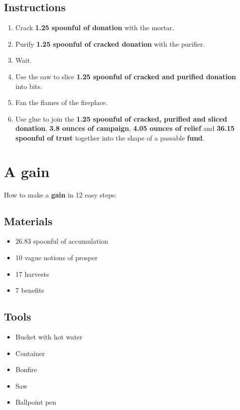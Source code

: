 \documentclass{article}
\begin{document}
\subsection{Instructions}\begin{enumerate}
\item 
Crack \textbf{1.25 spoonful of donation} with the mortar.
\item 
Purify \textbf{1.25 spoonful of cracked donation} with the purifier.
\item 
Wait.
\item 
Use the saw to slice \textbf{1.25 spoonful of cracked and purified donation} into bits.
\item 
Fan the flames of the fireplace.
\item 
Use glue to join the \textbf{1.25 spoonful of cracked, purified and sliced donation}, \textbf{3.8 ounces of campaign}, \textbf{4.05 ounces of relief} and \textbf{36.15 spoonful of trust} together into the shape of a passable \textbf{fund}.
\end{enumerate}
\newpage
\section{A gain}How to make a \textbf{gain} in 12 easy steps:

\subsection{Materials}\begin{itemize}
\item 
26.83 spoonful of accumulation
\item 
10 vague notions of prosper
\item 
17 harvests
\item 
7 benefits
\end{itemize}
\subsection{Tools}\begin{itemize}
\item 
Bucket with hot water
\item 
Container
\item 
Bonfire
\item 
Saw
\item 
Ballpoint pen
\end{itemize}
\end{document}
